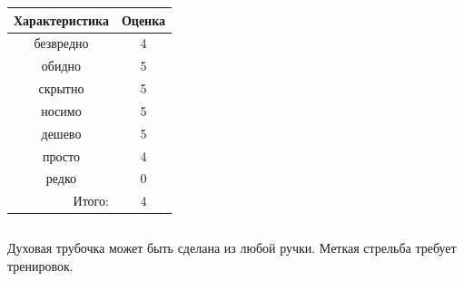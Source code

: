 \begin{frame}
\begin{columns}
            \begin{center}
                \begin{tabular}{c|c}
                    \hline\hline
                    Характеристика              & Оценка\\ \hline\hline
                    безвредно                   & 4 \\
                    обидно                      & 5 \\
                    скрытно                     & 5 \\
                    носимо                      & 5 \\
                    дешево                      & 5 \\
                    просто                      & 4 \\ 
                    редко                       & 0 \\ \hline
                    \multicolumn{1}{r|}{Итого:} & $4$ \\
                \end{tabular}
            \end{center}
    \end{columns}    
\end{frame}

Духовая трубочка может быть сделана из любой ручки. Меткая стрельба требует тренировок.


